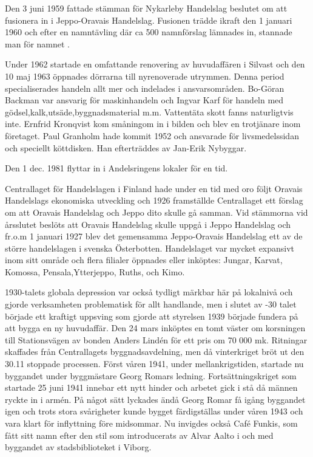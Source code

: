
Den 3 juni 1959 fattade stämman för Nykarleby Handelslag  beslutet om att fusionera in i Jeppo-Oravais Handelslag. Fusionen trädde ikraft den 1 januari 1960 och efter en namntävling där ca 500 namnförslag lämnades in, stannade man för namnet .

Under 1962 startade en omfattande renovering av huvudaffären i Silvast och den 10 maj 1963 öppnades dörrarna till nyrenoverade utrymmen. Denna period specialiserades handeln allt mer och indelades i ansvarsområden. Bo-Göran Backman var ansvarig för maskinhandeln och Ingvar Karf för handeln med gödsel,kalk,utsäde,byggnadsmaterial m.m. Vattentäta skott fanns naturligtvis inte. Ernfrid Kronqvist kom småningom in i bilden och blev en trotjänare inom företaget. Paul Granholm hade kommit 1952 och ansvarade för livsmedelssidan och speciellt köttdisken. Han efterträddes av Jan-Erik Nybyggar.

Den 1 dec. 1981 flyttar  in i Andelsringens lokaler för en tid.


Centrallaget för Handelslagen i Finland hade under en tid med oro följt Oravais Handelslags ekonomiska utveckling och 1926 framställde Centrallaget ett förslag om att Oravais Handelslag och Jeppo dito skulle gå samman. Vid stämmorna vid årsslutet beslöts att Oravais Handelslag skulle uppgå i Jeppo Handelslag och fr.o.m 1 januari 1927 blev det gemensamma Jeppo-Oravais Handelslag ett av de större handelslagen i svenska Österbotten. Handelslaget var mycket expansivt inom sitt område och flera filialer öppnades eller inköptes: Jungar, Karvat, Komossa, Pensala,Ytterjeppo, Ruths, och Kimo.

1930-talets globala depression var också tydligt märkbar här på lokalnivå och gjorde verksamheten problematisk för allt handlande, men i slutet av -30 talet började ett kraftigt uppsving som gjorde att styrelsen 1939 började fundera på att bygga en ny huvudaffär. Den 24 mars inköptes en tomt väster om korsningen till Stationsvägen av bonden Anders Lindén för ett pris om 70 000 mk. Ritningar skaffades från Centrallagets byggnadsavdelning, men då vinterkriget bröt ut den 30.11 stoppade processen. Först våren 1941, under mellankrigstiden, startade nu byggandet under byggmästare Georg Romars ledning. Fortsättningskriget som startade 25 juni 1941 innebar ett nytt hinder och arbetet gick i stå då männen ryckte in i armén. På något sätt lyckades ändå Georg Romar få igång byggandet igen och trots stora svårigheter  kunde bygget färdigställas under våren 1943 och vara klart för inflyttning före midsommar. Nu invigdes också Café Funkis, som fått sitt namn efter den stil som introducerats av Alvar Aalto i och med byggandet av stadsbiblioteket i Viborg.

